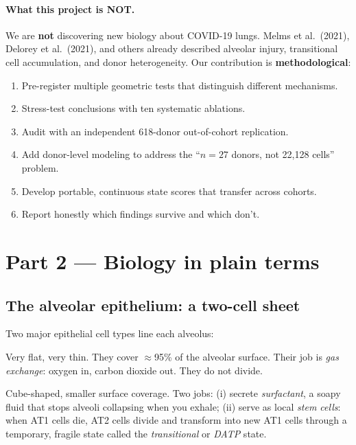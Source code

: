 \documentclass[11pt]{article}
\begin{document}
\paragraph{What this project is NOT.}
We are \textbf{not} discovering new biology about COVID-19 lungs. Melms et al.\ (2021), Delorey et al.\ (2021), and others already described alveolar injury, transitional cell accumulation, and donor heterogeneity. Our contribution is \textbf{methodological}:
\begin{enumerate}
\item Pre-register multiple geometric tests that distinguish different mechanisms.
\item Stress-test conclusions with ten systematic ablations.
\item Audit with an independent 618-donor out-of-cohort replication.
\item Add donor-level modeling to address the ``$n = 27$ donors, not 22{,}128 cells'' problem.
\item Develop portable, continuous state scores that transfer across cohorts.
\item Report honestly which findings survive and which don't.
\end{enumerate}


\section{Part 2 --- Biology in plain terms}

\subsection{The alveolar epithelium: a two-cell sheet}

Two major epithelial cell types line each alveolus:

\begin{description}[style=nextline]
\item[AT1 cells (alveolar type 1)] Very flat, very thin. They cover $\approx$95\% of the alveolar surface. Their job is \emph{gas exchange}: oxygen in, carbon dioxide out. They do not divide.
\item[AT2 cells (alveolar type 2)] Cube-shaped, smaller surface coverage. Two jobs: (i) secrete \emph{surfactant}, a soapy fluid that stops alveoli collapsing when you exhale; (ii) serve as local \emph{stem cells}: when AT1 cells die, AT2 cells divide and transform into new AT1 cells through a temporary, fragile state called the \emph{transitional} or \emph{DATP} state.
\end{description}
\end{document}
